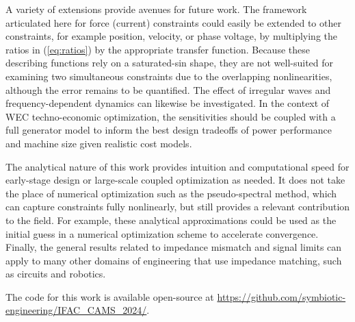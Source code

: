 \documentclass{ifacconf}
\renewcommand{\Re}{\operatorname{\mathbb{R}e}}
\renewcommand{\Im}{\operatorname{\mathbb{I}m}}
\begin{document}
A variety of extensions provide avenues for future work. The framework articulated here for force (current) constraints could easily be extended to other constraints, for example position, velocity, or phase voltage, by multiplying the ratios in (\ref{eq:ratios}) by the appropriate transfer function. Because these describing functions rely on a saturated-sin shape, they are not well-suited for examining two simultaneous constraints due to the overlapping nonlinearities, although the error remains to be quantified. The effect of irregular waves and frequency-dependent dynamics can likewise be investigated. In the context of WEC techno-economic optimization, the sensitivities should be coupled with a full generator model to inform the best design tradeoffs of power performance and machine size given realistic cost models. 

The analytical nature of this work provides intuition and computational speed for early-stage design or large-scale coupled optimization as needed. It does not take the place of numerical optimization such as the pseudo-spectral method, which can capture constraints fully nonlinearly, but still provides a relevant contribution to the field. For example, these analytical approximations could be used as the initial guess in a numerical optimization scheme to accelerate convergence. Finally, the general results related to impedance mismatch and signal limits can apply to many other domains of engineering that use impedance matching, such as circuits and robotics. 

The code for this work is available open-source at \url{https://github.com/symbiotic-engineering/IFAC_CAMS_2024/}.




\end{document}
